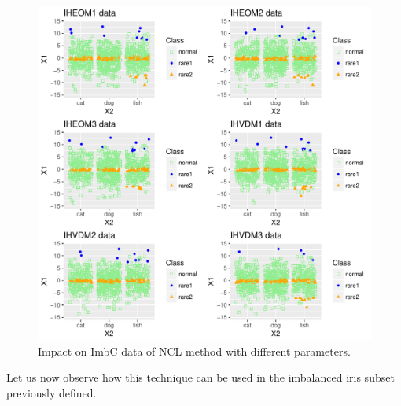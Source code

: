 \documentclass[10pt,a4paper]{article}\usepackage[]{graphicx}\usepackage[]{color}
\makeatletter
\def\maxwidth{ %
  \ifdim\Gin@nat@width>\linewidth
    \linewidth
  \else
    \Gin@nat@width
  \fi
}
\newenvironment{knitrout}{}{} %
\makeatother
\begin{document}
\begin{knitrout}\footnotesize
{}\color{fgcolor}\begin{figure}

{\centering \includegraphics[width=\maxwidth]{figures/UBL-ImbC_NCL_plot-1} 

}

\caption[Impact on ImbC data of NCL method with different parameters]{Impact on ImbC data of NCL method with different parameters.}\label{fig:ImbC_NCL_plot}
\end{figure}


\end{knitrout}

Let us now observe how this technique can be used in the imbalanced iris subset previously defined.
\end{document}

